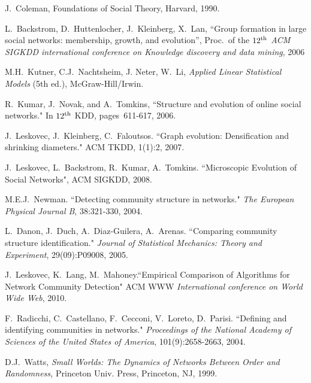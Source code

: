 \documentclass{sig-alternate}
\begin{document}
\begin{thebibliography}{99}

J.~Coleman, Foundations of Social Theory, Harvard, 1990.

 L.~Backstrom, D.~Huttenlocher, J.~Kleinberg, X.~Lan, ``Group formation in large social networks: membership, growth, and evolution'', Proc.~of the $12^{\rm th}$ {\it ACM SIGKDD international conference on Knowledge discovery and data mining}, 2006

M.H.~Kutner, C.J.~Nachtsheim, J. Neter, W.~Li, \emph{ Applied Linear Statistical Models} (5th ed.), McGraw-Hill/Irwin.

 R.~Kumar, J.~Novak, and A.~Tomkins, ``Structure and
evolution of online social networks." In $12^{\rm th}$ KDD, pages~611-617, 2006.

 J.~Leskovec, J.~Kleinberg, C.~Faloutsos. ``Graph
evolution: Densification and shrinking diameters." ACM
TKDD, 1(1):2, 2007.

 J.~Leskovec, L.~Backstrom, R.~Kumar, A.~Tomkins.  ``Microscopic Evolution of Social Networks", ACM SIGKDD, 2008. 

 M.E.J.~Newman. ``Detecting community structure in networks." \emph{The European Physical Journal B}, 38:321-330, 2004.

 L.~Danon, J.~Duch, A.~Diaz-Guilera, A.~Arenas. ``Comparing community structure identification." \emph{Journal of Statistical Mechanics: Theory and Experiment}, 29(09):P09008, 2005.

  J.~Leskovec, K.~Lang, M.~Mahoney.``Empirical Comparison of Algorithms for Network Community Detection" ACM WWW {\it International conference on World Wide Web}, 2010. 

 F.~Radicchi, C.~Castellano, F.~Cecconi, V.~Loreto,
D.~Parisi. ``Defining and identifying communities in networks."
{\it Proceedings of the National Academy of Sciences of the
United States of America}, 101(9):2658-2663, 2004.

D.J.~Watts, \emph{Small Worlds: The Dynamics of Networks Between Order and Randomness,} Princeton Univ. Press, Princeton, NJ, 1999.

\end{thebibliography}
\end{document}
